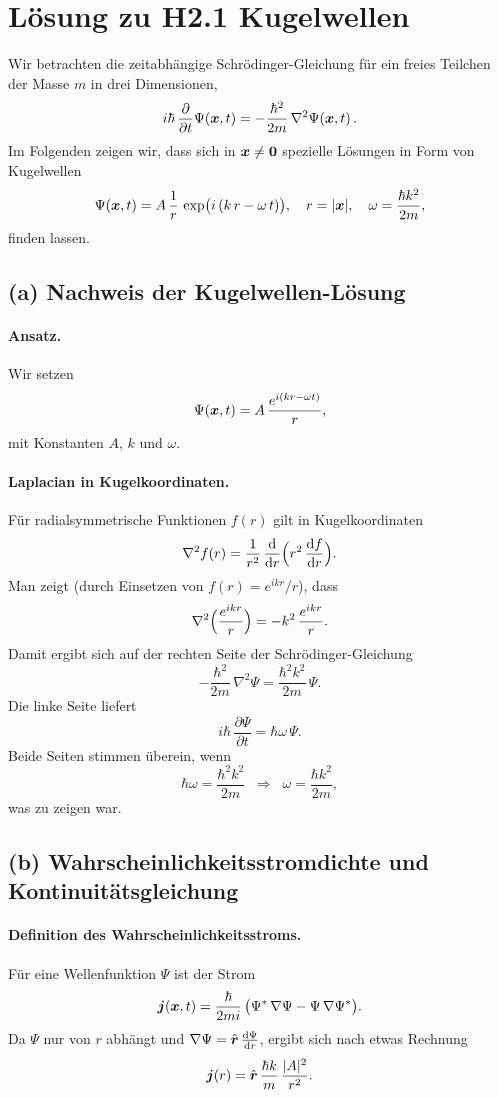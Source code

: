 \documentclass[a4paper,11pt]{article}
\begin{document}
\section*{Lösung zu H2.1 Kugelwellen}

Wir betrachten die zeitabhängige Schrödinger-Gleichung für ein freies Teilchen der Masse \(m\) in drei Dimensionen,
\[
i\hbar\,\frac{\partial}{\partial t}\Psi(\vb*{x},t)
=
-\frac{\hbar^2}{2m}\,\nabla^2\Psi(\vb*{x},t)\,.
\]
Im Folgenden zeigen wir, dass sich in \(\vb*{x}\neq \vb*{0}\) spezielle Lösungen in Form von Kugelwellen
\[
\Psi(\vb*{x},t)
= A\,\frac{1}{r}\,\exp\bigl(i\,(k\,r - \omega\,t)\bigr),
\quad
r = \lvert \vb*{x}\rvert,
\quad
\omega = \frac{\hbar k^2}{2m},
\]
finden lassen.

\subsection*{(a) Nachweis der Kugelwellen-Lösung}

\paragraph{Ansatz.}
Wir setzen
\[
\Psi(\vb*{x},t)
= A\,\frac{e^{i(kr - \omega t)}}{r},
\]
mit Konstanten \(A\), \(k\) und \(\omega\).

\paragraph{Laplacian in Kugelkoordinaten.}
Für radialsymmetrische Funktionen \(f(r)\) gilt in Kugelkoordinaten
\[
\nabla^2 f(r)
= \frac{1}{r^2}\,\frac{\mathrm{d}}{\mathrm{d}r}
\Bigl(r^2\,\frac{\mathrm{d}f}{\mathrm{d}r}\Bigr).
\]
Man zeigt (durch Einsetzen von \(f(r) = e^{ikr}/r\)), dass
\[
\nabla^2\Bigl(\frac{e^{ikr}}{r}\Bigr)
= -k^2\,\frac{e^{ikr}}{r}.
\]
Damit ergibt sich auf der rechten Seite der Schrödinger-Gleichung
\[
-\frac{\hbar^2}{2m}\,\nabla^2\Psi
= \frac{\hbar^2 k^2}{2m}\,\Psi.
\]
Die linke Seite liefert
\[
i\hbar\,\frac{\partial\Psi}{\partial t}
= \hbar\omega\,\Psi.
\]
Beide Seiten stimmen überein, wenn
\[
\hbar\omega = \frac{\hbar^2 k^2}{2m}
\;\;\Longrightarrow\;\;
\omega = \frac{\hbar k^2}{2m},
\]
was zu zeigen war.

\subsection*{(b) Wahrscheinlichkeitsstromdichte und Kontinuitätsgleichung}

\paragraph{Definition des Wahrscheinlichkeitsstroms.}
Für eine Wellenfunktion \(\Psi\) ist der Strom
\[
\vb*{j}(\vb*{x},t)
= \frac{\hbar}{2mi}\,\bigl(\Psi^*\,\nabla\Psi - \Psi\,\nabla\Psi^*\bigr).
\]
Da \(\Psi\) nur von \(r\) abhängt und \(\nabla \Psi = \hat{\vb*{r}}\,\frac{\mathrm{d}\Psi}{\mathrm{d}r}\),
ergibt sich nach etwas Rechnung
\[
\vb*{j}(r)
= \hat{\vb*{r}}\,\frac{\hbar k}{m}\,\frac{\lvert A\rvert^2}{r^2}.
\]
\end{document}
